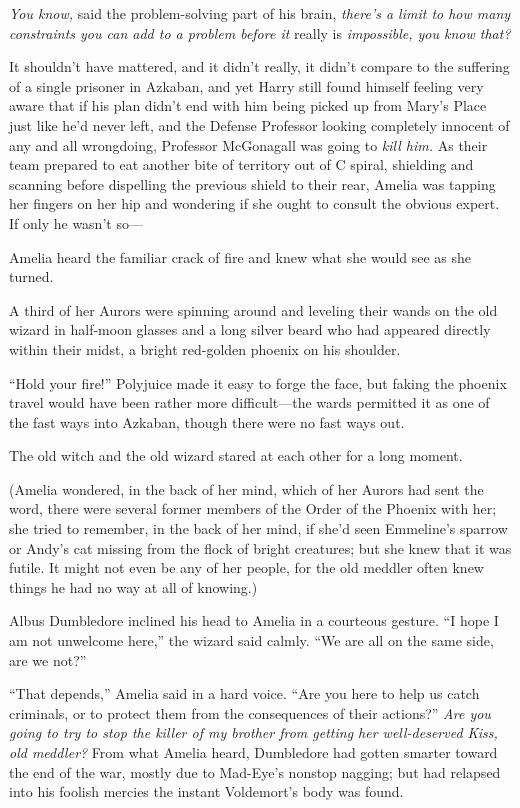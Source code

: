 \emph{You know,} said the problem-solving part of his brain, \emph{there’s a limit to how many constraints you can add to a problem before it} really is \emph{impossible, you know that?}

It shouldn’t have mattered, and it didn’t really, it didn’t compare to the suffering of a single prisoner in Azkaban, and yet Harry still found himself feeling very aware that if his plan didn’t end with him being picked up from Mary’s Place just like he’d never left, and the Defense Professor looking completely innocent of any and all wrongdoing, Professor McGonagall was going to \emph{kill him.}
\sbreak
As their team prepared to eat another bite of territory out of C spiral, shielding and scanning before dispelling the previous shield to their rear, Amelia was tapping her fingers on her hip and wondering if she ought to consult the obvious expert. If only he wasn’t so—

Amelia heard the familiar crack of fire and knew what she would see as she turned.

A third of her Aurors were spinning around and leveling their wands on the old wizard in half-moon glasses and a long silver beard who had appeared directly within their midst, a bright red-golden phoenix on his shoulder.

“Hold your fire!” Polyjuice made it easy to forge the face, but faking the phoenix travel would have been rather more difficult—the wards permitted it as one of the fast ways into Azkaban, though there were no fast ways out.

The old witch and the old wizard stared at each other for a long moment.

(Amelia wondered, in the back of her mind, which of her Aurors had sent the word, there were several former members of the Order of the Phoenix with her; she tried to remember, in the back of her mind, if she’d seen Emmeline’s sparrow or Andy’s cat missing from the flock of bright creatures; but she knew that it was futile. It might not even be any of her people, for the old meddler often knew things he had no way at all of knowing.)

Albus Dumbledore inclined his head to Amelia in a courteous gesture. “I hope I am not unwelcome here,” the wizard said calmly. “We are all on the same side, are we not?”

“That depends,” Amelia said in a hard voice. “Are you here to help us catch criminals, or to protect them from the consequences of their actions?” \emph{Are you going to try to stop the killer of my brother from getting her well-deserved Kiss, old meddler?} From what Amelia heard, Dumbledore had gotten smarter toward the end of the war, mostly due to Mad-Eye’s nonstop nagging; but had relapsed into his foolish mercies the instant Voldemort’s body was found.

